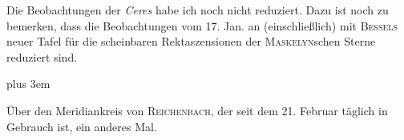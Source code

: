\par\indent Die Beobachtungen der \textit{Ceres} habe ich noch nicht reduziert. Dazu ist noch zu bemerken, dass die Beobachtungen vom 17. Jan. an (einschließlich) mit \textsc{Bessels} neuer Tafel für die scheinbaren Rektaszensionen der \textsc{Maskelyn}schen Sterne reduziert sind.

{\rightskip=0pt plus 3em
\par\indent Über den Meridiankreis von \textsc{Reichenbach}, der seit dem 21. Februar täglich in Gebrauch ist, ein anderes Mal.\par}
